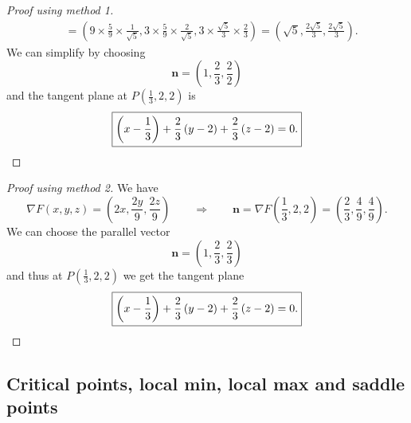 \begin{proof}[Proof using method 1]
\begin{equation*}
\begin{aligned}
    &= \left(9\times \frac{5}{9}\times \frac{1}{\sqrt{5}}, 3\times \frac{5}{9} \times \frac{2}{\sqrt{5}}, 3 \times \frac{\sqrt{5}}{3}\times \frac{2}{3}\right) 
    = \left(\sqrt{5}, \frac{2\sqrt{5}}{3}, \frac{2\sqrt{5}}{3}\right).
\end{aligned}
\end{equation*}
We can simplify by choosing
\begin{equation*}
    \textbf{n} = \left(1,\frac{2}{3}, \frac{2}{2}\right)
\end{equation*}
and the tangent plane at $P\left(\frac{1}{3}, 2,2\right)$ is
\begin{equation*}
    \fbox{$\displaystyle
    \left(x-\frac{1}{3}\right) + \frac{2}{3} \left(y-2\right) + \frac{2}{3} \left(z-2\right) = 0.
    $}
\end{equation*}
\end{proof}

\begin{proof}[Proof using method 2] We have
\begin{equation*}
    \nabla F(x,y,z) = \left(2x, \frac{2y}{9}, \frac{2z}{9}\right) \qquad\Longrightarrow\qquad \textbf{n} = \nabla F\left(\frac{1}{3}, 2,2\right) = \left(\frac{2}{3}, \frac{4}{9},\frac{4}{9}\right). 
\end{equation*}
We can choose the parallel vector
\begin{equation*}
    \textbf{n} = \left(1, \frac{2}{3}, \frac{2}{3}\right)
\end{equation*}
and thus at $P\left(\frac{1}{3}, 2,2\right)$ we get the tangent plane
\begin{equation*}
    \fbox{$\displaystyle
    \left(x-\frac{1}{3}\right) + \frac{2}{3} \left(y-2\right) + \frac{2}{3} \left(z-2\right) = 0.
    $}
\end{equation*}
\end{proof}

\subsection{Critical points, local min, local max and saddle points}